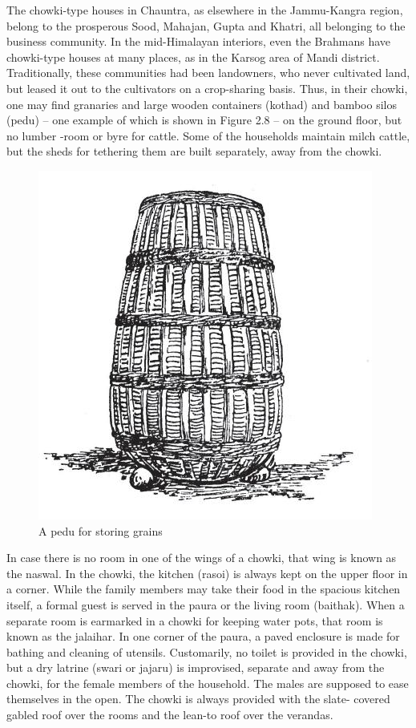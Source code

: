 The chowki-type houses in Chauntra, as elsewhere in the Jammu-Kangra region, belong to the prosperous Sood, Mahajan, Gupta and Khatri, all belonging to the business community. In the mid-Himalayan interiors, even the Brahmans have chowki-type houses at many places, as in the Karsog area of Mandi district. Traditionally, these communities had been landowners, who never cultivated land, but leased it out to the cultivators on a crop-sharing basis. Thus, in their chowki, one may find granaries and large wooden containers (kothad) and bamboo silos (pedu) -- one example of which is shown in Figure 2.8 -- on the ground floor, but no lumber -room or byre for cattle. Some of the households maintain milch cattle, but the sheds for tethering them are built separately, away from the chowki.

\begin{figure}[!htbp]
\includegraphics[scale=.42]{images/chap02-08.jpg}
\caption{A pedu for storing grains}\label{chap02-fig08}
\end{figure}

In case there is no room in one of the wings of a chowki, that wing is known as the naswal. In the chowki, the kitchen (rasoi) is always kept on the upper floor in a corner. While the family members may take their food in the spacious kitchen itself, a formal guest is served in the paura or the living room (baithak). When a separate room is earmarked in a chowki for keeping water pots, that room is known as the jalaihar. In one corner of the paura, a paved enclosure is made for bathing and cleaning of utensils. Customarily, no toilet is provided in the chowki, but a dry latrine (swari or jajaru) is improvised, separate and away from the chowki, for the female members of the household. The males are supposed to ease themselves in the open. The chowki is always provided with the slate- covered gabled roof over the rooms and the lean-to roof over the verandas.


